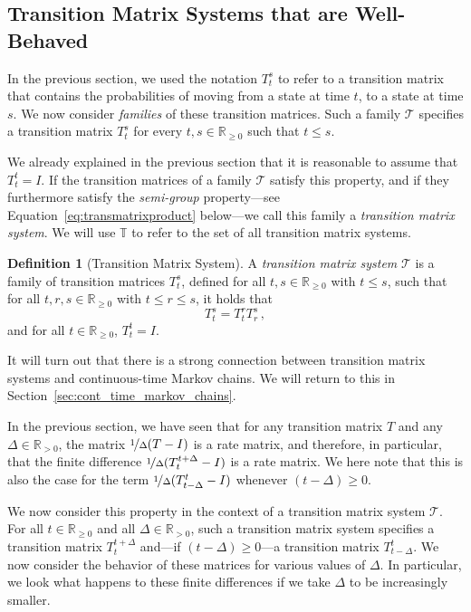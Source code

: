 \documentclass[10pt,a4paper]{paper}
\theoremstyle{definition}
\newtheorem{definition}{Definition}
\newcommand{\reals}{\mathbb{R}}
\newcommand{\realspos}{\reals_{>0}}
\newcommand{\realsnonneg}{\reals_{\geq 0}}
\begin{document}
\subsection{Transition Matrix Systems that are Well-Behaved}

In the previous section, we used the notation $T_t^s$ to refer to a transition matrix that contains the probabilities of moving from a state at time $t$, to a state at time $s$. We now consider \emph{families} of these transition matrices. Such a family $\mathcal{T}$ specifies a transition matrix $T_t^s$ for every $t,s\in\realsnonneg$ such that $t\leq s$. 

We already explained in the previous section that it is reasonable to assume that $T_t^t=I$. If the transition matrices of a family $\mathcal{T}$ satisfy this property, and if they furthermore satisfy the \emph{semi-group} property---see Equation~\ref{eq:transmatrixproduct} below---we call this family a \emph{transition matrix system}. We will use $\mathbb{T}$ to refer to the set of all transition matrix systems.

\begin{definition}[Transition Matrix System]\label{def:trans_mat_system}
A \emph{transition matrix system} $\mathcal{T}$ is a family of transition matrices $T_t^s$, defined for all $t,s\in\realsnonneg$ with $t\leq s$, such that for all $t,r,s\in\realsnonneg$ with $t\leq r\leq s$, it holds that
\begin{equation}\label{eq:transmatrixproduct}
T_t^s=T_t^r T_r^s\,,
\end{equation}
and for all $t\in\realsnonneg$, $T_t^t=I$.
\end{definition}
It will turn out that there is a strong connection between transition matrix systems and continuous-time Markov chains. We will return to this in Section~\ref{sec:cont_time_markov_chains}.

In the previous section, we have seen that for any transition matrix $T$ and any $\Delta\in\realspos$, the matrix $\nicefrac{1}{\Delta}(T - I)$ is a rate matrix, and therefore, in particular, that the finite difference $\nicefrac{1}{\Delta}(T_t^{t+\Delta} - I)$ is a rate matrix. We here note that this is also the case for the term $\nicefrac{1}{\Delta}(T_{t-\Delta}^t - I)$ whenever $(t-\Delta)\geq0$.

We now consider this property in the context of a transition matrix system $\mathcal{T}$. For all $t\in\realsnonneg$ and all $\Delta\in\realspos$, such a transition matrix system specifies a transition matrix $T_t^{t+\Delta}$ and---if $(t-\Delta)\geq0$---a transition matrix $T_{t-\Delta}^t$. We now consider the behavior of these matrices for various values of $\Delta$. In particular, we look what happens to these finite differences if we take $\Delta$ to be increasingly smaller. 
\end{document}
